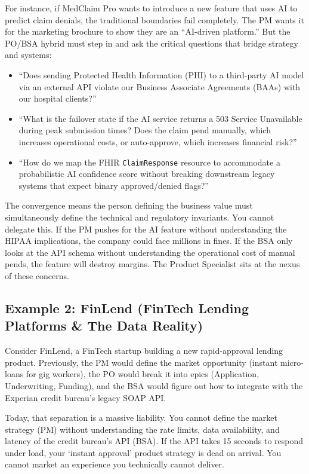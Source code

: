 \documentclass[
  11pt,
  openany,
  oneside]{book}
\providecommand{\tightlist}{%
  \setlength{\itemsep}{0pt}\setlength{\parskip}{0pt}}
\begin{document}
For instance, if MedClaim Pro wants to introduce a new feature that uses
AI to predict claim denials, the traditional boundaries fail completely.
The PM wants it for the marketing brochure to show they are an
``AI-driven platform.'' But the PO/BSA hybrid must step in and ask the
critical questions that bridge strategy and systems:

\begin{itemize}
\tightlist
\item
  ``Does sending Protected Health Information (PHI) to a third-party AI
  model via an external API violate our Business Associate Agreements
  (BAAs) with our hospital clients?''
\item
  ``What is the failover state if the AI service returns a 503 Service
  Unavailable during peak submission times? Does the claim pend
  manually, which increases operational costs, or auto-approve, which
  increases financial risk?''
\item
  ``How do we map the FHIR \texttt{ClaimResponse} resource to
  accommodate a probabilistic AI confidence score without breaking
  downstream legacy systems that expect binary approved/denied flags?''
\end{itemize}

The convergence means the person defining the business value must
simultaneously define the technical and regulatory invariants. You
cannot delegate this. If the PM pushes for the AI feature without
understanding the HIPAA implications, the company could face millions in
fines. If the BSA only looks at the API schema without understanding the
operational cost of manual pends, the feature will destroy margins. The
Product Specialist sits at the nexus of these concerns.

\subsection{Example 2: FinLend (FinTech Lending Platforms \& The Data
Reality)}\label{example-2-finlend-fintech-lending-platforms-the-data-reality}

Consider FinLend, a FinTech startup building a new rapid-approval
lending product. Previously, the PM would define the market opportunity
(instant micro-loans for gig workers), the PO would break it into epics
(Application, Underwriting, Funding), and the BSA would figure out how
to integrate with the Experian credit bureau's legacy SOAP API.

Today, that separation is a massive liability. You cannot define the
market strategy (PM) without understanding the rate limits, data
availability, and latency of the credit bureau's API (BSA). If the API
takes 15 seconds to respond under load, your `instant approval' product
strategy is dead on arrival. You cannot market an experience you
technically cannot deliver.
\end{document}

